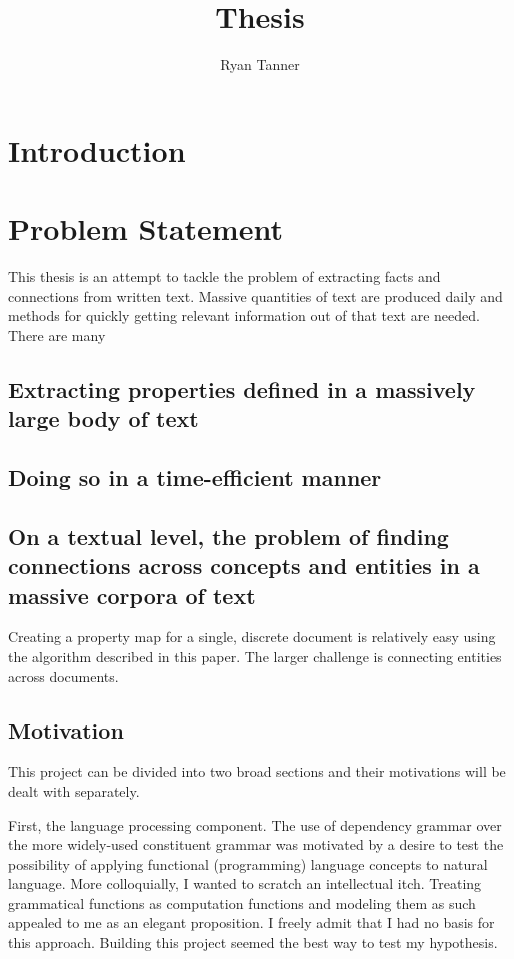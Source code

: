\documentclass[11pt]{article}
\title{Thesis}
\author{Ryan Tanner}
\begin{document}
\maketitle

\tableofcontents

\section{Introduction}

\section{Problem Statement}

This thesis is an attempt to tackle the problem of extracting facts and connections from written text.  Massive quantities of text are produced daily and methods for quickly getting relevant information out of that text are needed.  There are many 

\subsection{Extracting properties defined in a massively large body of text}



\subsection{Doing so in a time-efficient manner}

\subsection{On a textual level, the problem of finding connections across concepts and entities in a massive corpora of text}

Creating a property map for a single, discrete document is relatively easy using the algorithm described in this paper.  The larger challenge is connecting entities across documents.  

\subsection{Motivation}

This project can be divided into two broad sections and their motivations will be dealt with separately.

First, the language processing component. The use of dependency grammar over the more widely-used constituent grammar was motivated by a desire to test the possibility of applying functional (programming) language concepts to natural language.  More colloquially, I wanted to scratch an intellectual itch.  Treating grammatical functions as computation functions and modeling them as such appealed to me as an elegant proposition.  I freely admit that I had no basis for this approach.  Building this project seemed the best way to test my hypothesis.
\end{document}

